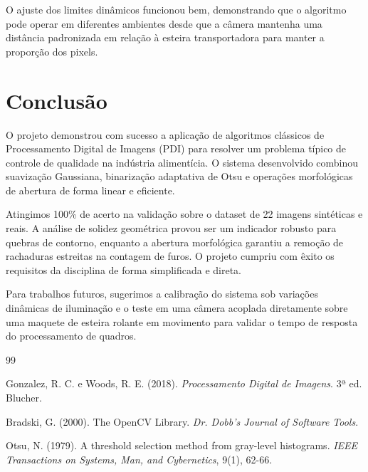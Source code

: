 \documentclass[12pt]{article}
\begin{document}
O ajuste dos limites dinâmicos funcionou bem, demonstrando que o algoritmo pode operar em diferentes ambientes desde que a câmera mantenha uma distância padronizada em relação à esteira transportadora para manter a proporção dos pixels.

\section{Conclusão}

O projeto demonstrou com sucesso a aplicação de algoritmos clássicos de Processamento Digital de Imagens (PDI) para resolver um problema típico de controle de qualidade na indústria alimentícia. O sistema desenvolvido combinou suavização Gaussiana, binarização adaptativa de Otsu e operações morfológicas de abertura de forma linear e eficiente.

Atingimos 100\% de acerto na validação sobre o dataset de 22 imagens sintéticas e reais. A análise de solidez geométrica provou ser um indicador robusto para quebras de contorno, enquanto a abertura morfológica garantiu a remoção de rachaduras estreitas na contagem de furos. O projeto cumpriu com êxito os requisitos da disciplina de forma simplificada e direta.

Para trabalhos futuros, sugerimos a calibração do sistema sob variações dinâmicas de iluminação e o teste em uma câmera acoplada diretamente sobre uma maquete de esteira rolante em movimento para validar o tempo de resposta do processamento de quadros.


\begin{thebibliography}{99}

 Gonzalez, R. C. e Woods, R. E. (2018). \textit{Processamento Digital de Imagens}. 3ª ed. Blucher.

 Bradski, G. (2000). The OpenCV Library. \textit{Dr. Dobb's Journal of Software Tools}.

 Otsu, N. (1979). A threshold selection method from gray-level histograms. \textit{IEEE Transactions on Systems, Man, and Cybernetics}, 9(1), 62-66.

\end{thebibliography}
\end{document}
